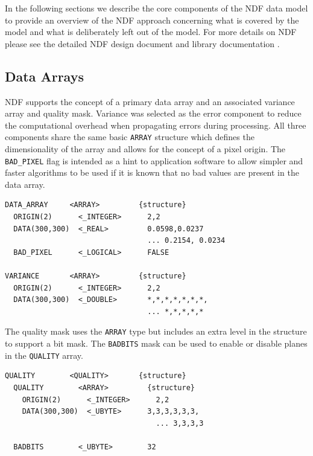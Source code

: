 \documentclass[final,authoryear,5p,times,twocolumn]{elsarticle}
\begin{document}
In the following sections we describe the core components of the NDF
data model to provide an overview of the NDF approach concerning what
is covered by the model and what is deliberately left out of the
model. For more details on NDF please see the detailed NDF design
document \citep[SGP/38;][]{SGP38} and library documentation \citep[SUN/33;][]{SUN33}.

\subsection{Data Arrays}

NDF supports the concept of a primary data array and an associated
variance array and quality mask. Variance was selected as the error
component to reduce the computational overhead when propagating errors
during processing. All three components share the same
basic \texttt{ARRAY} structure which defines the dimensionality of the
array and allows for the concept of a pixel origin. The
\texttt{BAD\_PIXEL} flag is intended as a hint to application
software to allow simpler and faster algorithms to be used if it is known
that no bad values are present in the data array.

{\small
\begin{verbatim}
DATA_ARRAY     <ARRAY>         {structure}
  ORIGIN(2)      <_INTEGER>      2,2
  DATA(300,300)  <_REAL>         0.0598,0.0237
                                 ... 0.2154, 0.0234
  BAD_PIXEL      <_LOGICAL>      FALSE

VARIANCE       <ARRAY>         {structure}
  ORIGIN(2)      <_INTEGER>      2,2
  DATA(300,300)  <_DOUBLE>       *,*,*,*,*,*,*,
                                 ... *,*,*,*,*
\end{verbatim}
}

The quality mask uses the \texttt{ARRAY} type but includes an extra
level in the structure to support a bit mask. The \texttt{BADBITS}
mask can be used to enable or disable planes in the \texttt{QUALITY} array.

{\small
\begin{verbatim}
QUALITY        <QUALITY>       {structure}
  QUALITY        <ARRAY>         {structure}
    ORIGIN(2)      <_INTEGER>      2,2
    DATA(300,300)  <_UBYTE>      3,3,3,3,3,3,
                                   ... 3,3,3,3

  BADBITS        <_UBYTE>        32
\end{verbatim}
}
\end{document}
